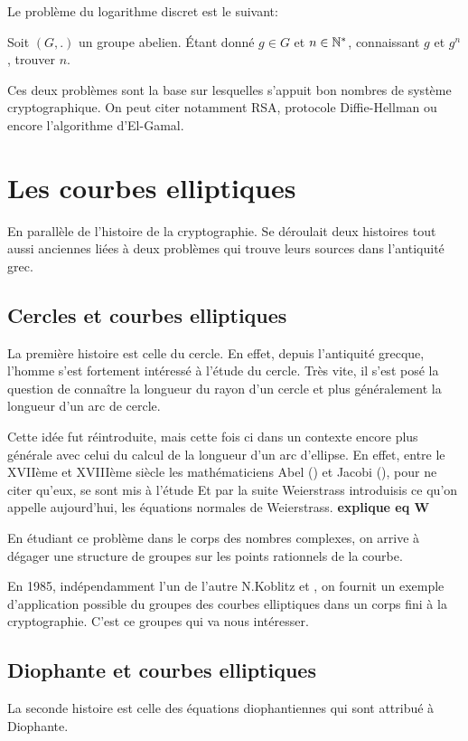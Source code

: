 Le problème du logarithme discret est le suivant: 

Soit $(G,.)$ un groupe abelien. Étant donné $g \in G$ et $n \in \mathbb{N}^*$, connaissant $g$ et
$g^{n}$, trouver $n$.

Ces deux problèmes sont la base sur lesquelles s'appuit bon nombres de système
cryptographique. On peut citer notamment RSA, protocole Diffie-Hellman ou encore
l'algorithme d'El-Gamal.


\section{Les courbes elliptiques}

En parallèle de l'histoire de la cryptographie. Se déroulait deux histoires tout aussi
anciennes liées à deux problèmes qui trouve leurs sources dans l'antiquité grec.

\subsection{Cercles et courbes elliptiques}
La première histoire est celle du cercle. En effet, depuis l'antiquité grecque, l'homme
s'est fortement intéressé à l'étude du cercle. Très vite, il s'est posé la question de
connaître la longueur du rayon d'un cercle et plus généralement la longueur d'un arc
de cercle. 

Cette idée fut réintroduite, mais cette fois ci dans un contexte encore plus générale
avec celui du calcul de la longueur d'un arc d'ellipse. En
effet, entre le XVIIème et XVIIIème siècle les mathématiciens Abel () et Jacobi
(), pour ne citer qu'eux, se sont mis à l'étude 
Et par la suite Weierstrass introduisis ce qu'on appelle aujourd'hui, les équations
normales de Weierstrass. 
\textbf{explique eq W}

En étudiant ce problème dans le corps des nombres complexes, on arrive à dégager une
structure de groupes sur les points rationnels de la courbe.

En 1985, indépendamment l'un de l'autre N.Koblitz et , on fournit un exemple d'application
possible du groupes des courbes elliptiques dans un corps fini à la cryptographie. C'est ce
groupes qui va nous intéresser.

\subsection{Diophante et courbes elliptiques}

La seconde histoire est celle des équations diophantiennes qui sont attribué à Diophante.

